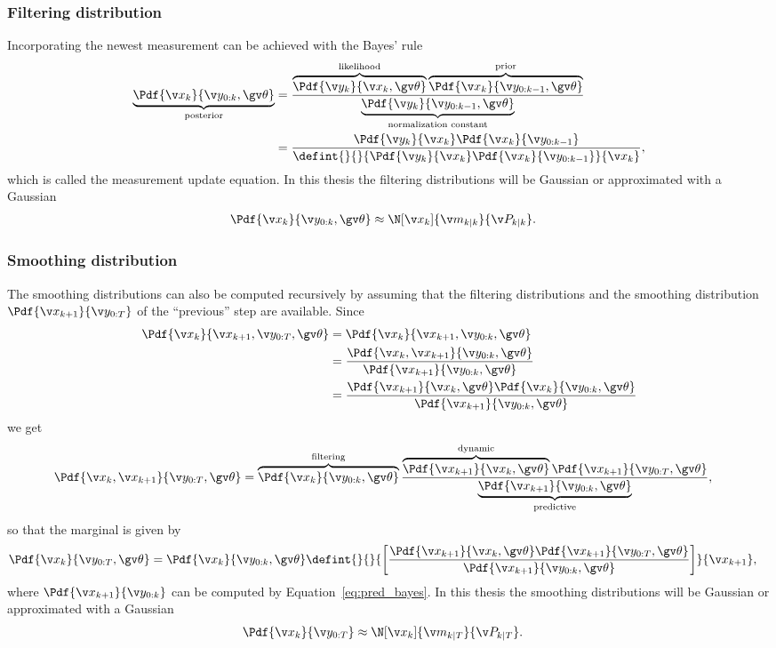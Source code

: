 \subsubsection*{Filtering distribution}
Incorporating the newest measurement can be achieved with the Bayes'
rule \parencite[see, e.g.,][]{gelman2004}
\begin{align}
	\underbrace{\Pdf{\xk}{\y_{0:k},\Th}}_\text{posterior}&=\frac{\overbrace{\Pdf{\yk}{\xk,\Th}}^\text{likelihood}\overbrace{\Pdf{\xk}{\y_{0:k-1},\Th}}^\text{prior}}{\underbrace{\Pdf{\y_{k}}{\y_{0:k-1},\Th}}_\text{normalization
	constant}}\nonumber\\
	&=\frac{\Pdf{\yk}{\xk}\Pdf{\xk}{\y_{0:k-1}}}{\defint{}{}{\Pdf{\yk}{\xk}\Pdf{\xk}{\y_{0:k-1}}}{\xk}},
	\label{eq:filt_bayes}
\end{align}
which is called the measurement update equation.
In this thesis the filtering distributions will be Gaussian or approximated with a Gaussian
\begin{align}
	\Pdf{\xk}{\y_{0:k},\Th}&\approx\N[\xk]{\m_{k|k}}{\P_{k|k}}.
\end{align}


\subsubsection*{Smoothing distribution}
The smoothing distributions can also be computed recursively by assuming that the filtering distributions
and the smoothing distribution $\Pdf{\x_{k+1}}{\Y}$ of the ``previous'' step are available.
Since
\begin{align*}
	\Pdf{\xk}{\x_{k+1},\Y,\Th}&=\Pdf{\xk}{\x_{k+1},\y_{0:k},\Th}\\
	&=\frac{\Pdf{\xk,\x_{k+1}}{\y_{0:k},\Th}}{\Pdf{\x_{k+1}}{\y_{0:k},\Th}}\\
	&=\frac{\Pdf{\x_{k+1}}{\xk,\Th}\Pdf{\xk}{\y_{0:k},\Th}}{\Pdf{\x_{k+1}}{\y_{0:k},\Th}}
\end{align*}
we get
\begin{align}
	\Pdf{\xk,\x_{k+1}}{\Y,\Th}&=\overbrace{\Pdf{\xk}{\y_{0:k},\Th}}^\text{filtering}\frac{\overbrace{\Pdf{\x_{k+1}}{\xk,\Th}}^\text{dynamic}\Pdf{\x_{k+1}}{\y_{0:T},\Th}}{\underbrace{\Pdf{\x_{k+1}}{\y_{0:k},\Th}}_\text{predictive}},
	\label{eq:smooth_joint_bayes}
\end{align}
so that the marginal is given by
\begin{align}
	\Pdf{\xk}{\Y,\Th}&=\Pdf{\xk}{\y_{0:k},\Th}\defint{}{}{\left[\frac{\Pdf{\x_{k+1}}{\xk,\Th}\Pdf{\x_{k+1}}{\Y,\Th}}{\Pdf{\x_{k+1}}{\y_{0:k},\Th}}\right]}{\x_{k+1}},
	\label{eq:smooth_bayes}
\end{align}
where $\Pdf{\x_{k+1}}{\y_{0:k}}$ can be computed by Equation~\eqref{eq:pred_bayes}.
In this thesis the smoothing distributions will be Gaussian or approximated with a Gaussian
\begin{align}
	\Pdf{\xk}{\Y}&\approx\N[\xk]{\m_{k|T}}{\P_{k|T}}.
	\label{eq:smoothing_gaussian}
\end{align}

